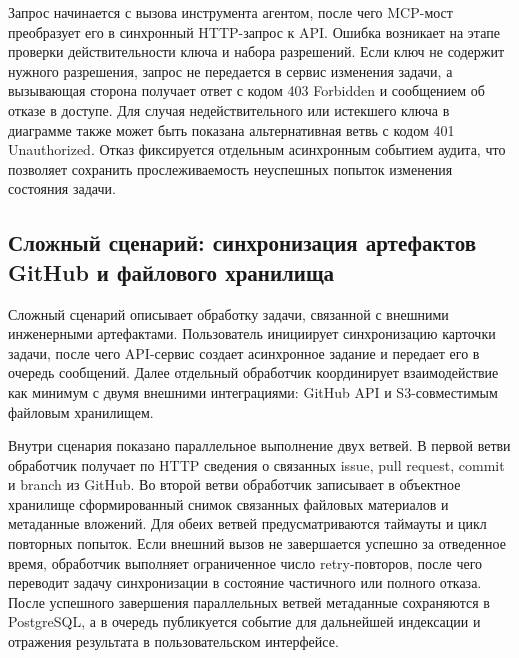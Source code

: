 Запрос начинается с вызова инструмента агентом, после чего MCP-мост преобразует его в синхронный HTTP-запрос к API. Ошибка возникает на этапе проверки действительности ключа и набора разрешений. Если ключ не содержит нужного разрешения, запрос не передается в сервис изменения задачи, а вызывающая сторона получает ответ с кодом 403 Forbidden и сообщением об отказе в доступе. Для случая недействительного или истекшего ключа в диаграмме также может быть показана альтернативная ветвь с кодом 401 Unauthorized. Отказ фиксируется отдельным асинхронным событием аудита, что позволяет сохранить прослеживаемость неуспешных попыток изменения состояния задачи.

\textheadingsep
\subsection{Сложный сценарий: синхронизация артефактов GitHub и файлового хранилища}
\headingtextsep

Сложный сценарий описывает обработку задачи, связанной с внешними инженерными артефактами. Пользователь инициирует синхронизацию карточки задачи, после чего API-сервис создает асинхронное задание и передает его в очередь сообщений. Далее отдельный обработчик координирует взаимодействие как минимум с двумя внешними интеграциями: GitHub API и S3-совместимым файловым хранилищем.

Внутри сценария показано параллельное выполнение двух ветвей. В первой ветви обработчик получает по HTTP сведения о связанных issue, pull request, commit и branch из GitHub. Во второй ветви обработчик записывает в объектное хранилище сформированный снимок связанных файловых материалов и метаданные вложений. Для обеих ветвей предусматриваются таймауты и цикл повторных попыток. Если внешний вызов не завершается успешно за отведенное время, обработчик выполняет ограниченное число retry-повторов, после чего переводит задачу синхронизации в состояние частичного или полного отказа. После успешного завершения параллельных ветвей метаданные сохраняются в PostgreSQL, а в очередь публикуется событие для дальнейшей индексации и отражения результата в пользовательском интерфейсе.
